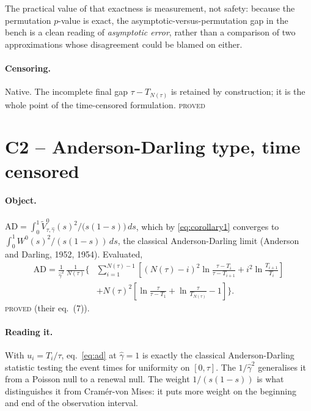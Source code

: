 \documentclass[11pt,a4paper]{article}
\newcommand{\Vtilde}{\widetilde{V}^{0}_{\tau,\hat\gamma}}
\newcommand{\Wbridge}{W^{0}}
\newcommand{\gh}{\hat\gamma}
\newcommand{\Ntau}{N(\tau)}
\newcommand{\PROVED}{\textsc{\textcolor{blue!55!black}{proved}}}
\begin{document}
\noindent
The practical value of that exactness is measurement, not safety: because the permutation
$p$-value is exact, the asymptotic-versus-permutation gap in the bench is a clean reading
of \emph{asymptotic error}, rather than a comparison of two approximations whose
disagreement could be blamed on either.

\paragraph{Censoring.} Native. The incomplete final gap $\tau - T_{\Ntau}$ is retained
by construction; it is the whole point of the time-censored formulation. \PROVED

\section{C2 -- Anderson-Darling type, time censored}

\paragraph{Object.}
$\mathrm{AD} = \int_0^1 \Vtilde(s)^2/\bigl(s(1-s)\bigr)\,ds$, which by
\eqref{eq:corollary1} converges to $\int_0^1 \Wbridge(s)^2/(s(1-s))\,ds$, the classical
Anderson-Darling limit (Anderson and Darling, 1952, 1954). Evaluated,
%
\begin{equation}
\begin{split}
\mathrm{AD} = \frac{1}{\gh^{2}}\,\frac{1}{\Ntau}
\Biggl\{&\sum_{i=1}^{\Ntau-1}\left[(\Ntau-i)^2\ln\frac{\tau - T_i}{\tau - T_{i+1}}
+ i^2 \ln\frac{T_{i+1}}{T_i}\right]\\
&+ \Ntau^{2}\left[\ln\frac{\tau}{\tau - T_1} + \ln\frac{\tau}{T_{\Ntau}} - 1\right]\Biggr\}.
\end{split}
\label{eq:ad}
\end{equation}
\PROVED{} (their eq.~(7)).

\paragraph{Reading it.} With $u_i = T_i/\tau$, eq.~\eqref{eq:ad} at $\gh = 1$ is exactly
the classical Anderson-Darling statistic testing the event times for uniformity on
$[0,\tau]$. The $1/\gh^2$ generalises it from a Poisson null to a renewal null. The
weight $1/(s(1-s))$ is what distinguishes it from Cramér-von Mises: it puts more weight
on the beginning and end of the observation interval.
\end{document}
